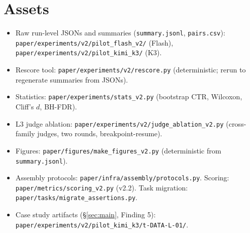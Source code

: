 \documentclass{article}
\newcommand{\code}[1]{\texttt{#1}}
\begin{document}



\appendix

\section{Assets}
\label{app:assets}

\begin{itemize}
\item Raw run-level JSONs and summaries (\code{summary.jsonl}, \code{pairs.csv}): \code{paper/experiments/v2/pilot\_flash\_v2/} (Flash), \code{paper/experiments/v2/pilot\_kimi\_k3/} (K3).
\item Rescore tool: \code{paper/experiments/v2/rescore.py} (deterministic; rerun to regenerate summaries from JSONs).
\item Statistics: \code{paper/experiments/stats\_v2.py} (bootstrap CTR, Wilcoxon, Cliff's $d$, BH-FDR).
\item L3 judge ablation: \code{paper/experiments/v2/judge\_ablation\_v2.py} (cross-family judges, two rounds, breakpoint-resume).
\item Figures: \code{paper/figures/make\_figures\_v2.py} (deterministic from \code{summary.jsonl}).
\item Assembly protocols: \code{paper/infra/assembly/protocols.py}. Scoring: \code{paper/metrics/scoring\_v2.py} (v2.2). Task migration: \code{paper/tasks/migrate\_assertions.py}.
\item Case study artifacts (\S\ref{sec:main}, Finding 5): \code{paper/experiments/v2/pilot\_kimi\_k3/t-DATA-L-01/}.
\end{itemize}
\end{document}

